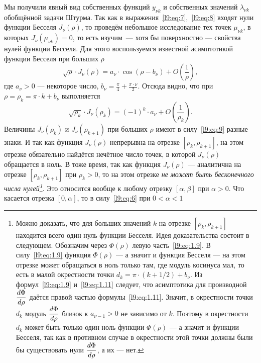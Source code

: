 Мы получили явный вид собственных функций $y_{\nu k}$ и собственных значений $\lambda_{\nu k}$ обобщённой задачи Штурма. Так как в выражения~\eqref{l9:eq:7},~\eqref{l9:eq:8} входят нули функции Бесселя $J_{\nu}(\rho)$, то проведём небольшое исследование тех точек $\mu_{\nu k}$, в которых $J_{\nu}\left(\mu_{\nu k}\right)=0$, то есть изучим~--- хотя бы поверхностно ---  свойства нулей функции Бесселя. Для этого воспользуемся известной асимптотикой функции Бесселя при больших $\rho$
\begin{equation}\label{l9:eq:1.9}
	\sqrt{\rho}\cdot J_{\nu}(\rho)=a_{\nu}\cdot\cos(\rho-b_\nu)+O\left(\frac{1}{\rho}\right),
\end{equation}
где $a_{\nu}>0$ --- некоторое число, $\displaystyle b_{\nu}=\frac{\pi}{4}+\frac{\pi\cdot\nu}{2}$. Отсюда видно, что при $\rho=\rho_k=\pi\cdot k+b_{\nu}$ выполняется
\begin{equation}\label{l9:eq:9}
	\sqrt{\rho_k}\cdot J_{\nu}(\rho_k)=(-1)^k\cdot a_{\nu}+O\left(\frac{1}{\rho_k}\right).
\end{equation}
Величины $J_{\nu}(\rho_k)$ и $J_{\nu}(\rho_{k+1})$ при больших $\rho$ имеют в силу~\eqref{l9:eq:9} разные знаки. И так как функция $J_{\nu}(\rho)$ непрерывна на отрезке $[\rho_k,\rho_{k+1}]$, на этом отрезке обязательно найдётся нечётное число точек, в которой $J_{\nu}(\rho)$ обращается в ноль. В тоже время, так как функция $J_{\nu}(\rho)$ --- аналитична на отрезке $[\rho_k,\rho_{k+1}]$ при $\rho_k>0$, то на этом отрезке \emph{не может быть бесконечного числа нулей\footnote{Можно доказать, что для больших значений $k$ на отрезке $[\rho_k,\rho_{k+1}]$ находится всего один нуль функции Бесселя. Идея доказательства состоит в следующем. Обозначим через $\Phi(\rho)$ левую часть~\eqref{l9:eq:1.9}. В силу~\eqref{l9:eq:1.9} функция $\Phi(\rho)$ --- а значит и функция Бесселя --- на этом отрезке может обращаться в ноль только там, где модуль косинуса мал, то есть в малой окрестности точки $d_k=\pi\cdot(k+1/2)+b_{\nu}$. Из формул~\eqref{l9:eq:1.9} и~\eqref{l9:eq:1.11} следует, что асимптотика для производной $\displaystyle\frac{d\Phi}{d\rho}$ даётся правой частью формулы~\eqref{l9:eq:1.11}. Значит, в окрестности точки $d_k$ модуль $\displaystyle\frac{d\Phi}{d\rho}$ близок к $a_{\nu-1}>0$ не зависимо от $k$. Поэтому в окрестности $d_k$ может быть только один ноль функции $\Phi(\rho)$ --- а значит и функции Бесселя, так как в противном случае в окрестности этой точки должны были бы существовать нули $\displaystyle\frac{d\Phi}{d\rho}$, а их --- нет.}}. Это относится вообще к любому отрезку $[\alpha,\beta]$ при $\alpha>0$. Что касается отрезка $[0,\alpha]$, то в силу~\eqref{l9:eq:6} при $0<\alpha<1$
